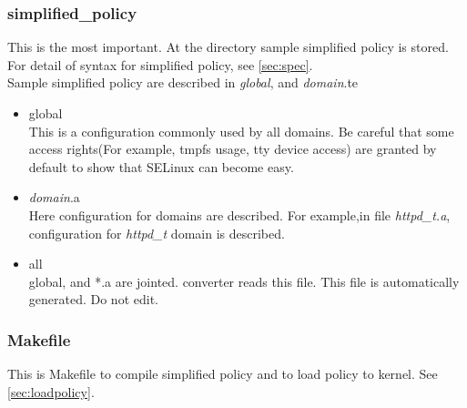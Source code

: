 \subsubsection{simplified\_policy}\label{sec:middlepolicy}
  This is the most important. At the directory sample simplified policy is stored. For detail of syntax for simplified policy, see \ref{sec:spec}.\\
  Sample simplified policy are described in {\it global}, and {\it domain}.te 
  \begin{itemize}
  \item global\\
    This is a configuration commonly used by all domains. Be careful
	that some access rights(For example, tmpfs usage, tty device
	access) are granted by default to show that SELinux can become
	easy.
  \item {\it domain}.a\\
    Here configuration for domains are described. For example,in file
	{\it httpd\_t.a}, configuration for {\it httpd\_t} domain is
	described.
   \item all\\
	 global, and *.a are jointed. converter reads this file. This
	file is automatically generated. Do not edit.
  \end{itemize}
 
\subsubsection{Makefile}
 This is Makefile to compile simplified policy and to load policy to
 kernel. See \ref{sec:loadpolicy}.

